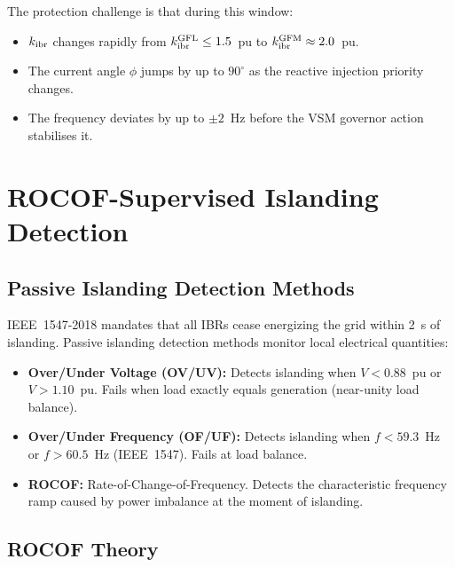 The protection challenge is that during this window:
\begin{itemize}
\item $k_\mathrm{ibr}$ changes rapidly from $k_\mathrm{ibr}^\mathrm{GFL} \leq 1.5$~pu
      to $k_\mathrm{ibr}^\mathrm{GFM} \approx 2.0$~pu.
\item The current angle $\phi$ jumps by up to $90^\circ$ as the reactive
      injection priority changes.
\item The frequency deviates by up to $\pm 2$~Hz before the VSM
      governor action stabilises it.
\end{itemize}

\section{ROCOF-Supervised Islanding Detection}
\label{sec:ch6_islanding}

\subsection{Passive Islanding Detection Methods}

IEEE~1547-2018 mandates that all IBRs cease energizing the grid within
2~s of islanding. Passive islanding detection methods monitor local
electrical quantities:
\begin{itemize}
\item \textbf{Over/Under Voltage (OV/UV):} Detects islanding when
      $V < 0.88$~pu or $V > 1.10$~pu. Fails when load exactly equals
      generation (near-unity load balance).
\item \textbf{Over/Under Frequency (OF/UF):} Detects islanding when
      $f < 59.3$~Hz or $f > 60.5$~Hz (IEEE~1547). Fails at load balance.
\item \textbf{ROCOF:} Rate-of-Change-of-Frequency. Detects the
      characteristic frequency ramp caused by power imbalance at the
      moment of islanding.
\end{itemize}

\subsection{ROCOF Theory}

